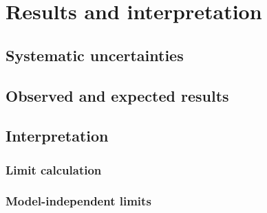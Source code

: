\chapter{Results and interpretation\label{sec:results}}

\section{Systematic uncertainties\label{sec:results-uncertainties}}

\section{Observed and expected results\label{sec:results-obsexp}}

\section{Interpretation\label{sec:results-interpretation}}

\subsection{Limit calculation\label{sec:results-limitcalc}}

\subsection{Model-independent limits\label{sec:results-limits}}